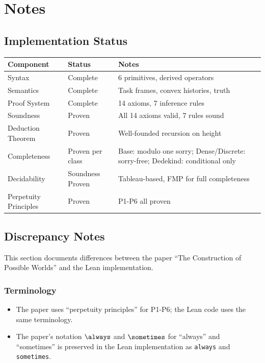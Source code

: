\documentclass[../BimodalReference.tex]{subfiles}
\begin{document}
\section{Notes}

\subsection{Implementation Status}

\begin{center}
\begin{tabular}{@{}lll@{}}
\toprule
Component & Status & Notes \\
\midrule
Syntax & Complete & 6 primitives, derived operators \\
Semantics & Complete & Task frames, convex histories, truth \\
Proof System & Complete & 14 axioms, 7 inference rules \\
Soundness & Proven & All 14 axioms valid, 7 rules sound \\
Deduction Theorem & Proven & Well-founded recursion on height \\
Completeness & Proven per class & Base: modulo one sorry; Dense/Discrete: sorry-free; Dedekind: conditional only \\
Decidability & Soundness Proven & Tableau-based, FMP for full completeness \\
Perpetuity Principles & Proven & P1-P6 all proven \\
\bottomrule
\end{tabular}
\end{center}

\subsection{Discrepancy Notes}

This section documents differences between the paper ``The Construction of Possible Worlds'' and the Lean implementation.

\subsubsection{Terminology}

\begin{itemize}
  \item The paper uses ``perpetuity principles'' for P1-P6; the Lean code uses the same terminology.
  \item The paper's notation $\always$ and $\sometimes$ for ``always'' and ``sometimes''
        is preserved in the Lean implementation as \texttt{always} and \texttt{sometimes}.
\end{itemize}
\end{document}
